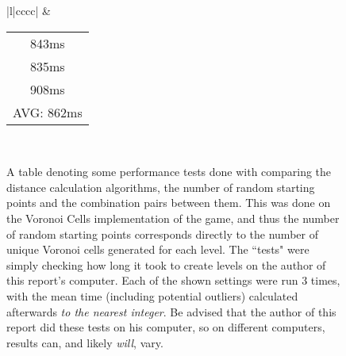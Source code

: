 \begin{figure}[H]
\begin{center}
{\begin{tabular}{|l|cccc|}
       &
      \begin{tabular}[c]{@{}c@{}}843ms\\ 835ms\\ 908ms\\ AVG: 862ms\end{tabular} \\ \hline
    \end{tabular}%
    }
    \end{center}
    \caption{A table denoting some performance tests done with comparing the distance calculation algorithms, the number of random starting points and the combination pairs between them. This was done on the Voronoi Cells implementation of the game, and thus the number of random starting points corresponds directly to the number of unique Voronoi cells generated for each level. The ``tests" were simply checking how long it took to create levels on the author of this report's computer. Each of the shown settings were run 3 times, with the mean time (including potential outliers) calculated afterwards \textit{to the nearest integer}. Be advised that the author of this report did these tests on his computer, so on different computers, results can, and likely \textit{will}, vary.}
    \label{fig:table5}
\end{figure}

